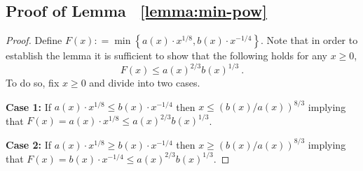 \subsection{Proof of Lemma~ \ref{lemma:min-pow}} \label{subsec:proof-lem-min-pow}
\begin{proof}%
Define $F(x): = \min \left\{a(x) \cdot x^{1/8}, b(x) \cdot  x^{-1/4}\right\}$.
Note that in order to establish the lemma it is sufficient to show that the following holds for any $x\geq 0$,
$$F(x)\leq  a(x)^{2/3} b(x)^{1/3}~.$$
To do so, fix $x\geq 0$ and divide into two cases.

\textbf{Case 1:}
If $a(x) \cdot x^{1/8}\leq b(x) \cdot  x^{-1/4}$ then $x \leq \left({b(x)}/{a(x)}\right)^{8/3}$ implying that $F(x) = a(x) \cdot x^{1/8} \leq a(x)^{2/3} b(x)^{1/3}$.

\textbf{Case 2:}
If $a(x) \cdot x^{1/8}\geq b(x) \cdot  x^{-1/4}$ then $x \geq \left({b(x)}/{a(x)}\right)^{8/3}$ implying that $F(x) = b(x) \cdot  x^{-1/4} \leq a(x)^{2/3} b(x)^{1/3}$.
%
\end{proof}





